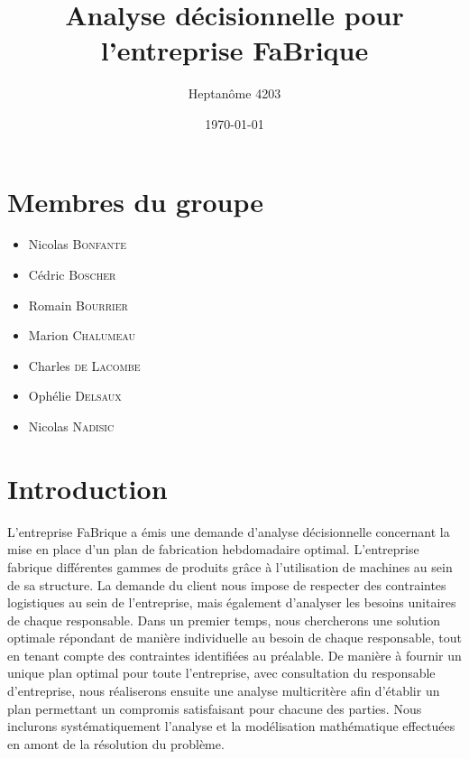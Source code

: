\documentclass[a4paper,10pt]{article}
\title{Analyse décisionnelle pour l'entreprise FaBrique}
\author{Heptanôme 4203}
\date{\today}
\begin{document}
\maketitle 


\section*{Membres du groupe}
\begin{itemize}
\item Nicolas \textsc{Bonfante}
\item Cédric \textsc{Boscher}
\item Romain \textsc{Bourrier}
\item Marion \textsc{Chalumeau}
\item Charles \textsc{de Lacombe}
\item Ophélie \textsc{Delsaux}
\item Nicolas \textsc{Nadisic}
\end{itemize}

\section*{Introduction}

  L'entreprise FaBrique a émis une demande d'analyse décisionnelle concernant la mise en place d'un plan de fabrication hebdomadaire optimal. L'entreprise fabrique différentes gammes de produits grâce à l'utilisation de machines au sein de sa structure. La demande du client nous impose de respecter des contraintes logistiques au sein de l'entreprise, mais également d'analyser les besoins unitaires de chaque responsable. Dans un premier temps, nous chercherons une solution optimale répondant de manière individuelle au besoin de chaque responsable, tout en tenant compte des contraintes identifiées au préalable. De manière à fournir un unique plan optimal pour toute l'entreprise, avec consultation du responsable d'entreprise, nous réaliserons ensuite une analyse multicritère afin d'établir un plan permettant un compromis satisfaisant pour chacune des parties. Nous inclurons systématiquement l'analyse et la modélisation mathématique effectuées en amont de la résolution du problème.
  
\newpage
\tableofcontents

\newpage
\end{document}
